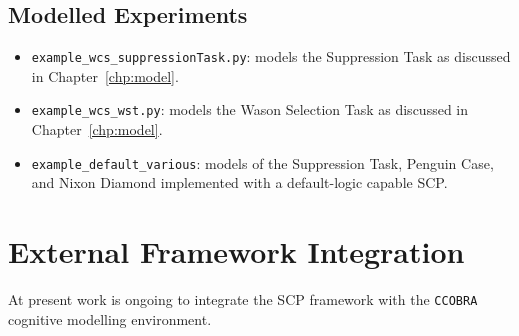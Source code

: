 \subsection{Modelled Experiments}
\begin{itemize}
\item \texttt{example\_wcs\_suppressionTask.py}: models the Suppression Task as discussed in Chapter~\ref{chp:model}.
\item \texttt{example\_wcs\_wst.py}: models the Wason Selection Task as discussed in Chapter~\ref{chp:model}.
\item \texttt{example\_default\_various}: models of the Suppression Task, Penguin Case, and Nixon Diamond implemented with a default-logic capable SCP.
\end{itemize}

\section{External Framework Integration}
At present work is ongoing to integrate the SCP framework with the \texttt{CCOBRA} \citep{ccobra} cognitive modelling environment.













